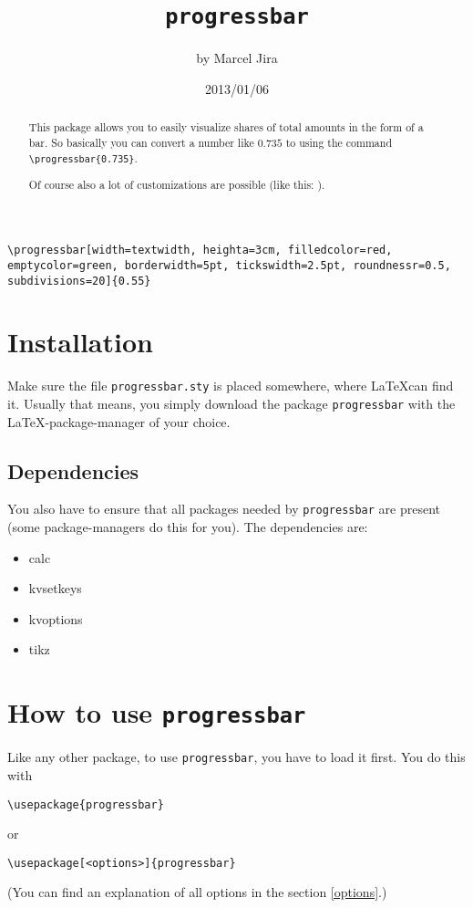 \documentclass{ltxdoc}
\title{\texttt{progressbar}}
\author{by Marcel Jira}
\date{2013/01/06}
\begin{document}
\maketitle

\begin{abstract}
This package allows you to easily visualize shares of total amounts in the form of a bar. So basically you can convert a number like $0.735$ to  using the command \lstinline+\progressbar{0.735}+.

Of course also a lot of customizations are possible (like this: ).
\end{abstract}

\noindent{}
\begin{lstlisting}[basicstyle=\ttfamily\normalsize\mdseries]
\progressbar[width=textwidth, heighta=3cm, filledcolor=red, emptycolor=green, borderwidth=5pt, tickswidth=2.5pt, roundnessr=0.5, subdivisions=20]{0.55}
\end{lstlisting}

\tableofcontents

\section{Installation}
Make sure the file \texttt{progressbar.sty} is placed somewhere, where \LaTeX can find it. Usually that means, you simply download the package \texttt{progressbar} with the \LaTeX-package-manager of your choice.

\subsection{Dependencies}
You also have to ensure that all packages needed by \texttt{progressbar} are present (some package-managers do this for you).
The dependencies are:
\begin{itemize}
	\item calc
	\item kvsetkeys
	\item kvoptions
	\item tikz
\end{itemize}
\section{How to use \texttt{progressbar}}
Like any other package, to use \texttt{progressbar}, you have to load it first. You do this with
\begin{lstlisting}
\usepackage{progressbar}
\end{lstlisting}
or
\begin{lstlisting}
\usepackage[<options>]{progressbar}
\end{lstlisting}
(You can find an explanation of all options in the section \ref{options}.)
\end{document}
